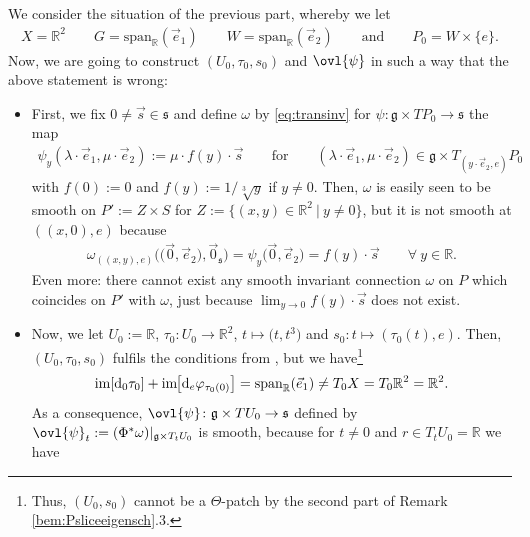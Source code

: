 \documentclass[pdftex]{sigma}
\numberwithin{equation}{section}
\begin{document}
\begin{Example}
\begin{enumerate}
  We consider the situation of the previous part, whereby we let
\begin{gather*}
X=\mathbb{R}^2\qquad G=\mathrm{span}_\mathbb{R}(\vec{e}_1)\qquad W=\mathrm{span}_\mathbb{R}(\vec{e}_2)\qquad \text{and}\qquad P_0=W\times \{e\}.
\end{gather*}
Now, we are going to construct $(U_0,\tau_0,s_0)$ and $\ovl{\psi}$ in such a way that the above statement is wrong:
\begingroup
\setlength{\leftmarginii}{13pt}
\begin{itemize}\itemsep=0pt
\item
First, we fix $0\neq \vec{s}\in \mathfrak{s}$ and define $\omega$ by \eqref{eq:transinv} for $\psi\colon \mathfrak{g}\times TP_0 \rightarrow \mathfrak{s}$ the map
    \begin{align*}
      \psi_{y}(\lambda \cdot\vec{e}_1,\mu\cdot \vec{e}_2):= \mu \cdot f(y)\cdot\vec{s}\qquad \text{for}\qquad (\lambda \cdot\vec{e}_1,\mu \cdot\vec{e}_2)\in \mathfrak{g}\times T_{(y\cdot\vec{e}_{2},e)}P_0
    \end{align*}    	
    with $f(0):=0$ and $f(y):=1\slash \sqrt[3]{y}$ if $y\neq 0$. Then, $\omega$ is easily seen to be smooth on $P':=Z\times S$ for $Z:= \{(x,y)\in \mathbb{R}^2\:|\: y\neq 0\}$, but it is not smooth at $((x,0),e)$ because
    \begin{align*}
      \omega_{((x,y),e)}\big(\big(\vec{0},\vec{e}_2\big),\vec{0}_{\mathfrak{s}}\big)=\psi_y\big(\vec{0},\vec{e}_2\big)=f(y)\cdot \vec{s}\qquad \forall\: y\in \mathbb{R}.
    \end{align*}
	Even more: there cannot exist any smooth invariant connection $\omega$ on $P$ which coincides on $P'$ with $\omega$, just because $\lim_{y\rightarrow 0}f(y)\cdot \vec{s}$ does not exist.
\item
Now, we let $U_0:=\mathbb{R}$, $\tau_0 \colon U_0 \rightarrow \mathbb{R}^2$, $t\mapsto \big(t,t^3\big)$ and $s_0\colon t \mapsto (\tau_0(t),e)$. Then, $(U_0,\tau_0,s_0)$ fulfils the conditions from \cite{HarSni}, but we have\footnote{
Thus, $(U_0,s_0)$ cannot be a $\Theta$-patch by the second part of Remark \ref{bem:Psliceeigensch}.3.}
\begin{gather*}
\mathrm{im}[\mathrm{d}_0\tau_0] + \mathrm{im}\hspace{-1pt}\big[\mathrm{d}_e\varphi_{\tau_0(0)}\big] = \mathrm{span}_{\mathbb{R}}(\vec{e}_1)\neq T_0X =T_0\mathbb{R}^2=\mathbb{R}^2.
\end{gather*}
      As a consequence, $\ovl{\psi}\colon \mathfrak{g}\times TU_0\rightarrow \mathfrak{s}$ defined by $\ovl{\psi}_t:=(\Phi^*\omega)|_{\mathfrak{g}\times T_t U_0}$ is smooth, because for $t\neq 0$ and $r\in T_t U_0 =\mathbb{R}$ we have

\end{itemize}
\end{enumerate}
\end{Example}
\end{document}
